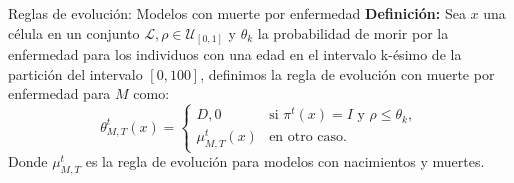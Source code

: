 \documentclass[9pt]{beamer}
\begin{document}
\begin{frame}{Reglas de evolución: Modelos con muerte por enfermedad}
\textbf{Definición:} Sea $x$ una célula en un conjunto $\mathcal{L},\rho\in\mathcal{U}_{[0,1]}$ y $\theta_k$ la probabilidad de morir por la enfermedad para los individuos con una edad en el intervalo k-ésimo de la partición del intervalo $[0,100]$, definimos la regla de evolución con muerte por enfermedad para $M$ como:
\begin{equation}
    \theta_{M,T}^t(x)=\left\{\begin{array}{ll}
        D,0 & \text{si }\pi^t(x)=I\text{ y }\rho\leq\theta_k, \\
        \mu_{M,T}^t(x) & \text{en otro caso.}
    \end{array}\right.
\end{equation}
Donde $\mu_{M,T}^t$ es la regla de evolución para modelos con nacimientos y muertes.

\end{frame}
\end{document}
